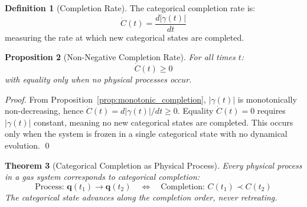 \documentclass[12pt,a4paper]{article}
\newtheorem{theorem}{Theorem}[section]
\newtheorem{proposition}[theorem]{Proposition}
\theoremstyle{definition}
\newtheorem{definition}[theorem]{Definition}
\theoremstyle{remark}
\begin{document}
\begin{definition}[Completion Rate]
\label{def:completion_rate}
The categorical completion rate is:
\begin{equation}
\dot{C}(t) = \frac{d|\gamma(t)|}{dt}
\label{eq:completion_rate}
\end{equation}
measuring the rate at which new categorical states are completed.
\end{definition}

\begin{proposition}[Non-Negative Completion Rate]
\label{prop:nonnegative_completion}
For all times $t$:
\begin{equation}
\dot{C}(t) \geq 0
\end{equation}
with equality only when no physical processes occur.
\end{proposition}

\begin{proof}
From Proposition~\ref{prop:monotonic_completion}, $|\gamma(t)|$ is monotonically non-decreasing, hence $\dot{C}(t) = d|\gamma(t)|/dt \geq 0$. Equality $\dot{C}(t) = 0$ requires $|\gamma(t)|$ constant, meaning no new categorical states are completed. This occurs only when the system is frozen in a single categorical state with no dynamical evolution. \qed
\end{proof}

\begin{theorem}[Categorical Completion as Physical Process]
\label{thm:completion_physical}
Every physical process in a gas system corresponds to categorical completion:
\begin{equation}
\text{Process: } \mathbf{q}(t_1) \to \mathbf{q}(t_2) \quad \Longleftrightarrow \quad \text{Completion: } C(t_1) \prec C(t_2)
\end{equation}
The categorical state advances along the completion order, never retreating.
\end{theorem}
\end{document}

